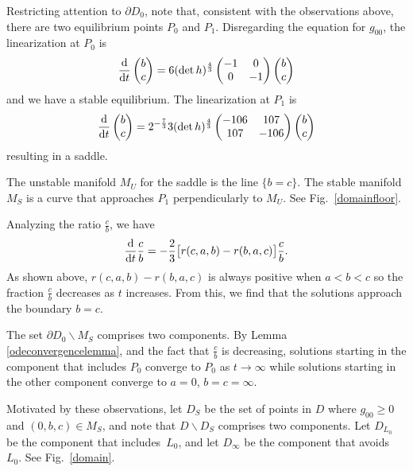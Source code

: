 \documentclass[10pt,a4paper]{amsart}
\numberwithin{equation}{section}
\newcommand{\dtime}{\frac{{\rm d}}{{\rm d} t}} %
\begin{document}
Restricting attention to $\partial D_0$, note that, consistent with the observations above, there are two equilibrium points $P_0$ and $P_1$. Disregarding the equation for $g_{00}$, the linearization at $P_0$ is
\[
\dtime \begin{pmatrix}
	b \\
	c
	\end{pmatrix}
		= 6 (\det h)^{\frac{4}{3}} \begin{pmatrix}
				-1 & 0 \\
				0 & -1
				\end{pmatrix}
				\begin{pmatrix}
					b \\
					c
					\end{pmatrix}
\]
and we have a stable equilibrium. The linearization at $P_1$ is				
\[
\dtime \begin{pmatrix}
	b \\
	c
	\end{pmatrix}
		= 2^{-\frac{7}{3}} 3 (\det h)^{\frac{4}{3}} \begin{pmatrix}
				-106 & 107 \\
				107 & -106
				\end{pmatrix}
				\begin{pmatrix}
					b \\
					c
					\end{pmatrix}
\]
resulting in a saddle.

The unstable manifold $M_U$ for the saddle is the line $\{b = c\}$. The stable manifold $M_S$ is a curve that approaches $P_1$ perpendicularly to $M_U$. See Fig.~\ref{domainfloor}.

Analyzing the ratio $\frac{c}{b}$, we have
\[
\dtime \frac{c}{b} = -\frac{2}{3} \bigl[r(c, a, b) - r(b, a, c) \bigr] \frac{c}{b}.
\]
As shown above, $r(c, a, b) - r(b, a, c)$ is always positive when $a < b < c$ so the fraction $\frac{c}{b}$ decreases as $t$ increases. From this, we find that the solutions approach the boundary $b = c$.

The set $\partial D_0 \backslash M_S$ comprises two components. By Lemma \ref{odeconvergencelemma}, and the fact that $\frac{c}{b}$ is decreasing, solutions starting in the component that includes $P_0$ converge to $P_0$ as $t \rightarrow \infty$ while solutions starting in the other component converge to $a = 0$, $b = c = \infty$.

Motivated by these observations, let $D_S$ be the set of points in $D$ where $g_{00} \geq 0$ and $(0, b, c) \in M_S$, and note that $D \backslash D_S$ comprises two components. Let $D_{L_0}$ be the component that includes~$L_0$, and let $D_{\infty}$ be the component that avoids~$L_0$. See Fig.~\ref{domain}.
\end{document}
